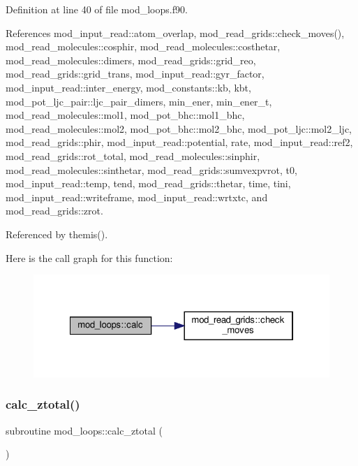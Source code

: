 Definition at line 40 of file mod\+\_\+loops.\+f90.



References mod\+\_\+input\+\_\+read\+::atom\+\_\+overlap, mod\+\_\+read\+\_\+grids\+::check\+\_\+moves(), mod\+\_\+read\+\_\+molecules\+::cosphir, mod\+\_\+read\+\_\+molecules\+::costhetar, mod\+\_\+read\+\_\+molecules\+::dimers, mod\+\_\+read\+\_\+grids\+::grid\+\_\+reo, mod\+\_\+read\+\_\+grids\+::grid\+\_\+trans, mod\+\_\+input\+\_\+read\+::gyr\+\_\+factor, mod\+\_\+input\+\_\+read\+::inter\+\_\+energy, mod\+\_\+constants\+::kb, kbt, mod\+\_\+pot\+\_\+ljc\+\_\+pair\+::ljc\+\_\+pair\+\_\+dimers, min\+\_\+ener, min\+\_\+ener\+\_\+t, mod\+\_\+read\+\_\+molecules\+::mol1, mod\+\_\+pot\+\_\+bhc\+::mol1\+\_\+bhc, mod\+\_\+read\+\_\+molecules\+::mol2, mod\+\_\+pot\+\_\+bhc\+::mol2\+\_\+bhc, mod\+\_\+pot\+\_\+ljc\+::mol2\+\_\+ljc, mod\+\_\+read\+\_\+grids\+::phir, mod\+\_\+input\+\_\+read\+::potential, rate, mod\+\_\+input\+\_\+read\+::ref2, mod\+\_\+read\+\_\+grids\+::rot\+\_\+total, mod\+\_\+read\+\_\+molecules\+::sinphir, mod\+\_\+read\+\_\+molecules\+::sinthetar, mod\+\_\+read\+\_\+grids\+::sumvexpvrot, t0, mod\+\_\+input\+\_\+read\+::temp, tend, mod\+\_\+read\+\_\+grids\+::thetar, time, tini, mod\+\_\+input\+\_\+read\+::writeframe, mod\+\_\+input\+\_\+read\+::wrtxtc, and mod\+\_\+read\+\_\+grids\+::zrot.



Referenced by themis().

Here is the call graph for this function\+:
\nopagebreak
\begin{figure}[H]
\begin{center}
\leavevmode
\includegraphics[width=322pt]{namespacemod__loops_a6e4de9cf9c585c364502a63d328071bd_cgraph}
\end{center}
\end{figure}
\mbox{\label{namespacemod__loops_acfec0f16ef59b6277e9dfd13d5026965}} 
\subsubsection{\texorpdfstring{calc\+\_\+ztotal()}{calc\_ztotal()}}
{\footnotesize\ttfamily subroutine mod\+\_\+loops\+::calc\+\_\+ztotal (\begin{DoxyParamCaption}{ }\end{DoxyParamCaption})}



